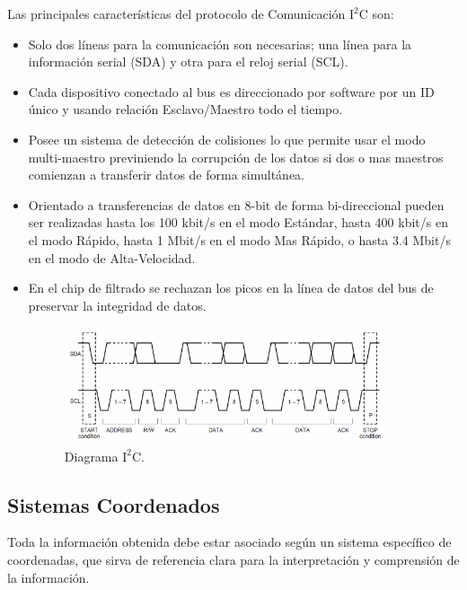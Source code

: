 \documentclass[12pt,a4paper]{article}
\begin{document}
Las principales características del protocolo de Comunicación $\mathrm{I^2C}$ \cite{I2C} son:
\begin{itemize}
	\item Solo dos líneas para la comunicación son necesarias; una línea para la información serial (SDA) y otra para el reloj serial (SCL).
	
	\item Cada dispositivo conectado al bus es direccionado por software por un ID único y usando relación Esclavo/Maestro todo el tiempo.
	
	\item Posee un sistema de detección de colisiones lo que permite usar el modo multi-maestro previniendo la corrupción de los datos si dos o mas maestros comienzan a transferir datos de forma simultánea.
	
	\item Orientado a transferencias de datos en 8-bit de forma bi-direccional pueden ser realizadas hasta los 100 kbit/s en el modo Estándar, hasta 400 kbit/s en el modo Rápido, hasta 1 Mbit/s en el modo Mas Rápido, o hasta 3.4 Mbit/s en el modo de Alta-Velocidad.
	
	\item En el chip de filtrado se rechazan los picos en la línea de datos del bus de preservar la integridad de datos.
	
	\begin{figure}[H]
		\centering
		\includegraphics[width=0.9\textwidth]{images/Diagrama_I2C}
		\caption{Diagrama $\mathrm{I^2C.}$}
		\label{fig:diagramaI2C}
	\end{figure}
\end{itemize}

\subsection{Sistemas Coordenados}
Toda la información obtenida debe estar asociado según un sistema específico de coordenadas, que sirva de referencia clara para la interpretación y comprensión de la información.
\end{document}
